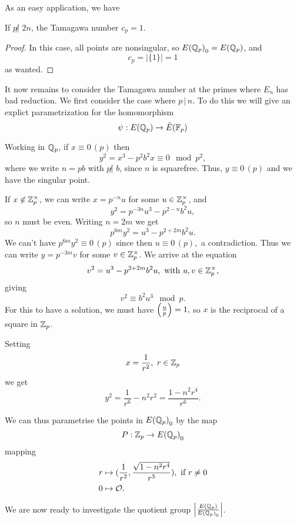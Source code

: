 \documentclass[12pt, a4paper]{amsart}
\begin{document}
As an easy application, we have

\begin{cor}
  If $p \not| \,\, 2n$, the Tamagawa number $c_p = 1$.
\end{cor}

\begin{proof}
  In this case, all points are nonsingular, so ${E({\mathbb Q}_p)}_0 = {E({\mathbb Q}_p)}$, and
  \[c_p = \left| \{1\} \right| = 1\]
  as wanted.
\end{proof}

It now remains to consider the Tamagawa number at the primes where $E_n$ has
bad reduction. We first consider the case where $p \, | \, n$. To do this
we will give an explict parametrization for the homomorphism
\[\psi : {E({\mathbb Q}_p)} \rightarrow {\tilde{E}(\mathbb{F}_p)}\]

Working in ${\mathbb Q}_p$, if $x \equiv 0 \, (p)$ then
\[y^2 = x^3 - p^{2}b^2 x \equiv 0 \mod{p^2}, \]
where we write $n = p b$ with $p \not| \,\, b $, since $n$ is squarefree.
Thus, $y \equiv 0 \, (p)$ and we have the singular point.

If $x \not\in {\mathbb Z}_p^\times$, we can write $x = p^{-n} u$ for some $u \in
{\mathbb Z}_p^\times$, and
\[y^2 = p^{-3n}u^3 - p^{2-n}b^2u,\]
so $n$ must be even. Writing $n = 2m$ we get
\[p^{6m}y^2 = u^3 - p^{2+2m}b^2u.\]
We can't have $p^{6m}y^2 \equiv 0 \, (p)$ since then
$u \equiv 0 \, (p),$ a contradiction. Thus we can write
$y = p^{-3m}v$ for some $v \in \mathbb{Z}_p^\times$. We arrive at the equation
\[v^2 = u^3 - p^{2+2m}b^2u, \text{ with } u, v \in \mathbb{Z}_p^\times,\]
giving
\[v^2 \equiv b^2u^3 \mod{p}.\]
For this to have a solution, we must have $\left(\frac{u}{p}\right) = 1,$
so $x$ is the reciprocal of a square in ${\mathbb Z}_p$.

Setting 
\[x = \frac{1}{r^2}, \,\, r \in {\mathbb Z}_p\]
we get
\[y^2 = \frac{1}{r^6}-{n^2}{r^2} = \frac{1-n^2r^4}{r^6}.\]

We can thus parametrise the points in ${E({\mathbb Q}_p)}_0$ by the map
\[
    P : {\mathbb Z}_p \rightarrow {E({\mathbb Q}_p)}_0  \]
mapping
\begin{equation} \label{eq:p-param}
  \begin{split}
    r &\mapsto (\frac{1}{r^2}, \frac{\sqrt{1-n^2r^4}}{r^3}), \text{ if } r \neq 0 \\
    0 &\mapsto {\mathcal O}.
  \end{split}
\end{equation}

We are now ready to investigate the quotient group $\left| \frac{{E({\mathbb Q}_p)}}{{E({\mathbb Q}_p)}_0}
\right|$.
\end{document}
